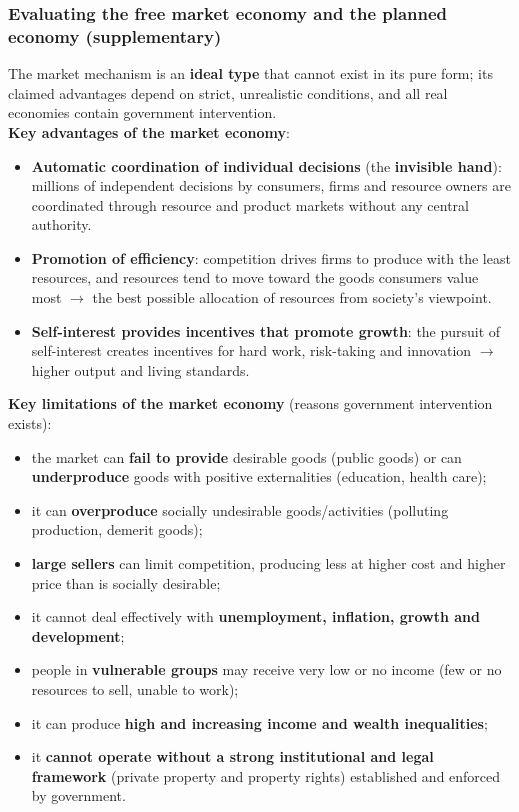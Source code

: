 \documentclass[a4paper,12pt]{article}
\newcommand{\needbold}[1]{\textcolor{red!70!black}{\textbf{#1}}}
\begin{document}
\subsubsection*{Evaluating the free market economy and the planned economy (supplementary)}
The market mechanism is an \needbold{ideal type} that cannot exist in its pure form; its claimed advantages depend on strict, unrealistic conditions, and all real economies contain government intervention.
\\
\textbf{Key advantages of the market economy}:
\begin{itemize}
  \item \textbf{Automatic coordination of individual decisions} (the \textbf{invisible hand}): millions of independent decisions by consumers, firms and resource owners are coordinated through resource and product markets without any central authority.
  \item \textbf{Promotion of efficiency}: competition drives firms to produce with the least resources, and resources tend to move toward the goods consumers value most $\to$ the best possible allocation of resources from society's viewpoint.
  \item \textbf{Self-interest provides incentives that promote growth}: the pursuit of self-interest creates incentives for hard work, risk-taking and innovation $\to$ higher output and living standards.
\end{itemize}
\textbf{Key limitations of the market economy} (reasons government intervention exists):
\begin{itemize}
  \item the market can \textbf{fail to provide} desirable goods (public goods) or can \textbf{underproduce} goods with positive externalities (education, health care);
  \item it can \textbf{overproduce} socially undesirable goods/activities (polluting production, demerit goods);
  \item \textbf{large sellers} can limit competition, producing less at higher cost and higher price than is socially desirable;
  \item it cannot deal effectively with \textbf{unemployment, inflation, growth and development};
  \item people in \textbf{vulnerable groups} may receive very low or no income (few or no resources to sell, unable to work);
  \item it can produce \textbf{high and increasing income and wealth inequalities};
  \item it \textbf{cannot operate without a strong institutional and legal framework} (private property and property rights) established and enforced by government.
\end{itemize}
\end{document}
